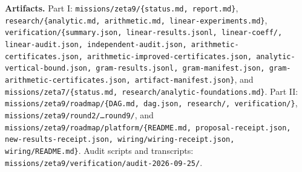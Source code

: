 \documentclass[11pt]{article}
\begin{document}
\textbf{Artifacts.} Part I: \texttt{missions/zeta9/\{status.md, report.md\}},
\texttt{research/\{analytic.md, arithmetic.md, linear-experiments.md\}},
\texttt{verification/\{summary.json, linear-results.jsonl, linear-coeff/, linear-audit.json,
independent-audit.json, arithmetic-certificates.json, arithmetic-improved-certificates.json,
analytic-vertical-bound.json, gram-results.jsonl, gram-manifest.json,
gram-arithmetic-certificates.json, artifact-manifest.json\}}, and
\texttt{missions/zeta7/\{status.md, research/analytic-foundations.md\}}. Part II:
\texttt{missions/zeta9/roadmap/\{DAG.md, dag.json, research/, verification/\}},
\texttt{missions/zeta9/round2/\dots round9/}, and
\texttt{missions/zeta9/roadmap/platform/\{README.md, proposal-receipt.json,
new-results-receipt.json, wiring/wiring-receipt.json, wiring/README.md\}}.
Audit scripts and transcripts: \texttt{missions/zeta9/verification/audit-2026-09-25/}.
\end{document}
